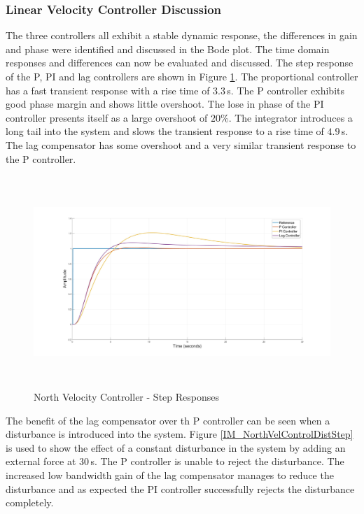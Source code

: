 \documentclass[12pt]{report}
\begin{document}
\subsubsection{Linear Velocity Controller Discussion}
The three controllers all exhibit a stable dynamic response, the differences in gain and phase were identified and discussed in the Bode plot. The time domain responses and differences can now be evaluated and discussed. The step response of the P, PI and lag controllers are shown in Figure \ref{IM_NorthVelControlStep}. The proportional controller has a fast transient response with a rise time of $3.3$\,s. The P controller exhibits good phase margin and shows little overshoot. The lose in phase of the PI controller presents itself as a large overshoot of $20$\%. The integrator introduces a long tail into the system and slows the transient response to a rise time of $4.9$\,s. The lag compensator has some overshoot and a very similar transient response to the P controller.

\begin{figure}[H]
	\centering
	\includegraphics[height = 8cm]{../Design/Matlab/Controllers/north_velocity_step.jpg}
	\caption{North Velocity Controller -  Step Responses}
	\label{IM_NorthVelControlStep}
\end{figure}	

The benefit of the lag compensator over th P controller can be seen when a disturbance is introduced into the system. Figure \ref{IM_NorthVelControlDistStep} is used to show the effect of a constant disturbance in the system by adding an external force at $30$\,s. The P controller is unable to reject the disturbance. The increased low bandwidth gain of the lag compensator manages to reduce the disturbance and as expected the PI controller successfully rejects the disturbance completely.
\end{document}
